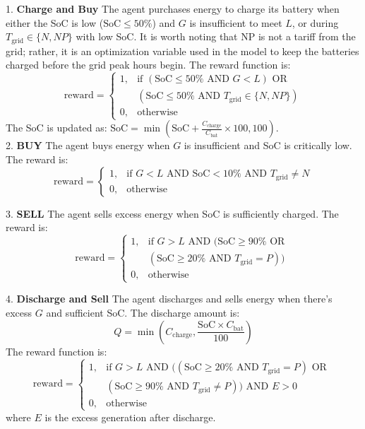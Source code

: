 \documentclass[preprint,12pt]{elsarticle}
\begin{document}
1. \textbf{Charge and Buy}  
   The agent purchases energy to charge its battery when either the SoC is low ($\text{SoC} \leq 50\%$) and $G$ is insufficient to meet $L$, or during $T_{\text{grid}} \in \{N, NP\}$ with low SoC. It is worth noting that NP is not a tariff from the grid; rather, it is an optimization variable used in the model to keep the batteries charged before the grid peak hours begin. The reward function is:
   \[
    \text{reward} = 
    \begin{cases} 
    1, & \text{if } (\text{SoC} \leq 50\% \text{ AND } G < L) \text{ OR } \\
    & (\text{SoC} \leq 50\% \text{ AND } T_{\text{grid}} \in \{N, NP\}) \\
    0, & \text{otherwise}
    \end{cases}
    \]
   The SoC is updated as: $\text{SoC} = \min(\text{SoC} + \frac{C_{\text{charge}}}{C_{\text{bat}}} \times 100, 100)$.\\

2. \textbf{BUY}  
   The agent buys energy when $G$ is insufficient and SoC is critically low. The reward is:
   \[
   \text{reward} = 
   \begin{cases} 
      1, & \text{if } G < L \text{ AND SoC} < 10\% \text{ AND } T_{\text{grid}} \neq N \\
      0, & \text{otherwise} 
   \end{cases}
   \]

3. \textbf{SELL}  
   The agent sells excess energy when SoC is sufficiently charged. The reward is:
   \[
   \text{reward} = 
   \begin{cases} 
      1, & \text{if } G > L \text{ AND } (\text{SoC} \geq 90\% \text{ OR } \\
      & (\text{SoC} \geq 20\% \text{ AND } T_{\text{grid}} = P)) \\
      0, & \text{otherwise} 
   \end{cases}
   \]

4. \textbf{Discharge and Sell}  
   The agent discharges and sells energy when there's excess $G$ and sufficient SoC. The discharge amount is:
   \[
   Q = \min(C_{\text{charge}}, \frac{\text{SoC} \times C_{\text{bat}}}{100})
   \]
   The reward function is:
   \[
    \text{reward} = 
    \begin{cases} 
    1, & \text{if } G > L \text{ AND } ((\text{SoC} \geq 20\% \text{ AND } T_{\text{grid}} = P) \text{ OR } \\
    & (\text{SoC} \geq 90\% \text{ AND } T_{\text{grid}} \neq P)) \text{ AND } E > 0 \\
    0, & \text{otherwise}
    \end{cases}
    \]
   where $E$ is the excess generation after discharge.
\end{document}
